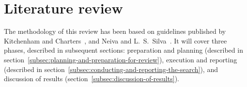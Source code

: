 \section{Literature review}\label{sec:literature-review}

The methodology of this review has been based on guidelines published by Kitchenham and Charters~\cite{kitchenham_guidelines_2007}, and Neiva and L.~S.~Silva~\cite{neiva_systematic_2016}.
It will cover three phases, described in subsequent sections: preparation and planning (described in section~\ref{subsec:planning-and-preparation-for-review}), execution and reporting (described in section~\ref{subsec:conducting-and-reporting-the-search}), and discussion of results (section~\ref{subsec:discussion-of-results}).






